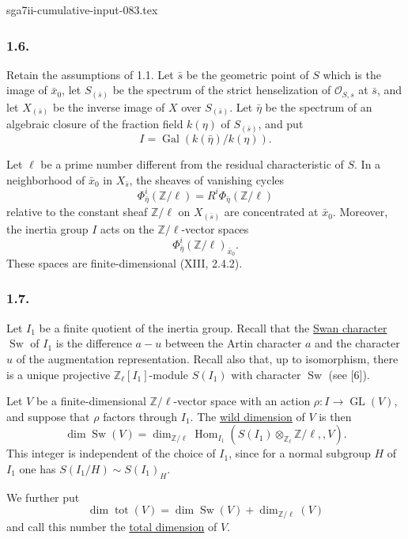 \begin{filecontents*}{sga7ii-cumulative-input-083.tex}
\subsubsection*{1.6.}
Retain the assumptions of 1.1.  Let $\bar s$ be the geometric point
of $S$ which is the image of $\bar x_0$, let $S_{(\bar s)}$ be the
spectrum of the strict henselization of $\mathcal O_{S,s}$ at
$\bar s$, and let $X_{(\bar s)}$ be the inverse image of $X$ over
$S_{(\bar s)}$.  Let $\bar\eta$ be the spectrum of an algebraic
closure of the fraction field $k(\eta)$ of $S_{(\bar s)}$, and put
\[
I=\operatorname{Gal}(k(\bar\eta)/k(\eta)).
\]

Let $\ell$ be a prime number different from the residual
characteristic of $S$.  In a neighborhood of $\bar x_0$ in
$X_{\bar s}$, the sheaves of vanishing cycles
\[
\Phi^i_{\bar\eta}(\mathbb Z/\ell)
=R^i\Phi_{\bar\eta}(\mathbb Z/\ell)
\]
relative to the constant sheaf $\mathbb Z/\ell$ on
$X_{(\bar s)}$ are concentrated at $\bar x_0$.  Moreover, the
inertia group $I$ acts on the $\mathbb Z/\ell$-vector spaces
\[
\Phi^i_{\bar\eta}(\mathbb Z/\ell)_{\bar x_0}.
\]
These spaces are finite-dimensional (XIII, 2.4.2).

\subsubsection*{1.7.}
Let $I_1$ be a finite quotient of the inertia group.  Recall that
the \underline{Swan character} $\operatorname{Sw}$ of $I_1$ is the
difference $a-u$ between the Artin character $a$ and the character
$u$ of the augmentation representation.  Recall also that, up to
isomorphism, there is a unique projective $\mathbb Z_\ell[I_1]$-module
$S(I_1)$ with character $\operatorname{Sw}$ (see [6]).

Let $V$ be a finite-dimensional $\mathbb Z/\ell$-vector space with
an action $\rho:I\to\operatorname{GL}(V)$, and suppose that $\rho$
factors through $I_1$.  The \underline{wild dimension} of $V$ is
then
\begin{equation}\tag{1.7.1}
\dim\operatorname{Sw}(V)
=\dim_{\mathbb Z/\ell}
\operatorname{Hom}_{I_1}\!\left(
S(I_1)\otimes_{\mathbb Z_\ell}\mathbb Z/\ell,,V\right).
\end{equation}
This integer is independent of the choice of $I_1$, since for a
normal subgroup $H$ of $I_1$ one has
$S(I_1/H)\sim S(I_1)_H$.

We further put
\[
\dim\operatorname{tot}(V)
=\dim\operatorname{Sw}(V)+\dim_{\mathbb Z/\ell}(V)
\]
and call this number the \underline{total dimension} of $V$.


\end{filecontents*}
